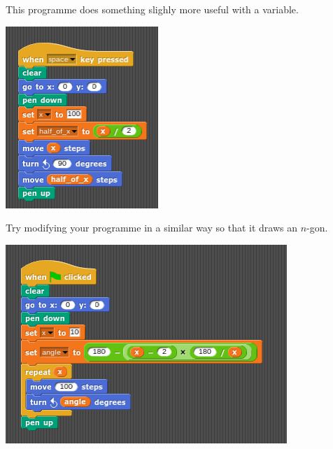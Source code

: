 \documentclass[11pt,a4paper]{scrartcl}
\begin{document}
This programme does something slighly more useful with a variable.
\begin{center}
\includegraphics{line_half_line.png}
\end{center}
Try modifying your programme in a similar way so that it draws an
$n$-gon.
\begin{center}
\includegraphics{n_gon.png}
\end{center}
\end{document}

